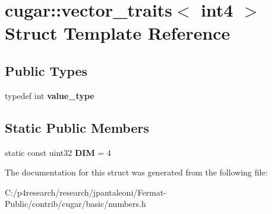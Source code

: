 \hypertarget{structcugar_1_1vector__traits_3_01int4_01_4}{}\section{cugar\+:\+:vector\+\_\+traits$<$ int4 $>$ Struct Template Reference}
\label{structcugar_1_1vector__traits_3_01int4_01_4}
\subsection*{Public Types}
\begin{DoxyCompactItemize}
\item 
\mbox{\label{structcugar_1_1vector__traits_3_01int4_01_4_a81c265bf2e0bc0b4793d5c09b84602c0}} 
typedef int {\bfseries value\+\_\+type}
\end{DoxyCompactItemize}
\subsection*{Static Public Members}
\begin{DoxyCompactItemize}
\item 
\mbox{\label{structcugar_1_1vector__traits_3_01int4_01_4_af670535504d5d749aa9a2c3eb9ef97bf}} 
static const uint32 {\bfseries D\+IM} = 4
\end{DoxyCompactItemize}


The documentation for this struct was generated from the following file\+:\begin{DoxyCompactItemize}
\item 
C\+:/p4research/research/jpantaleoni/\+Fermat-\/\+Public/contrib/cugar/basic/numbers.\+h\end{DoxyCompactItemize}
